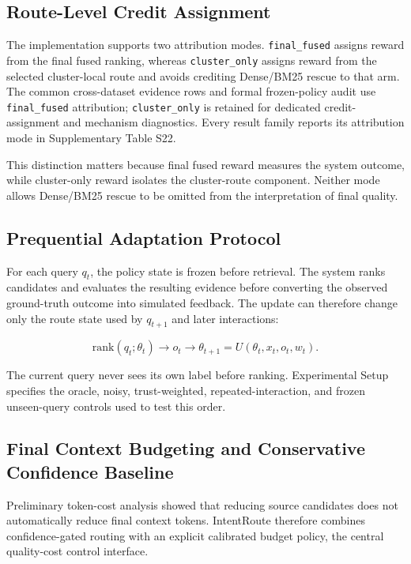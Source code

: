 \subsection{Route-Level Credit Assignment}
\label{sec:04-method:route-level-credit-assignment}

The implementation supports two attribution modes. \nolinkurl{final_fused} assigns reward from the final fused ranking, whereas \nolinkurl{cluster_only} assigns reward from the selected cluster-local route and avoids crediting Dense/BM25 rescue to that arm. The common cross-dataset evidence rows and formal frozen-policy audit use \nolinkurl{final_fused} attribution; \nolinkurl{cluster_only} is retained for dedicated credit-assignment and mechanism diagnostics. Every result family reports its attribution mode in Supplementary Table S22.

This distinction matters because final fused reward measures the system outcome, while cluster-only reward isolates the cluster-route component. Neither mode allows Dense/BM25 rescue to be omitted from the interpretation of final quality.

\subsection{Prequential Adaptation Protocol}
\label{sec:04-method:prequential-adaptation-protocol}

For each query $q_t$, the policy state is frozen before retrieval. The system ranks candidates and evaluates the resulting evidence before converting the observed ground-truth outcome into simulated feedback. The update can therefore change only the route state used by $q_{t+1}$ and later interactions:

\[
\text{rank}(q_t;\theta_t)\rightarrow o_t\rightarrow
\theta_{t+1}=U(\theta_t,x_t,o_t,w_t).
\]

The current query never sees its own label before ranking. Experimental Setup specifies the oracle, noisy, trust-weighted, repeated-interaction, and frozen unseen-query controls used to test this order.

\subsection{Final Context Budgeting and Conservative Confidence Baseline}
\label{sec:04-method:final-context-budgeting-and-conservative-confidence-baseline}

Preliminary token-cost analysis showed that reducing source candidates does not automatically reduce final context tokens. IntentRoute therefore combines confidence-gated routing with an explicit calibrated budget policy, the central quality-cost control interface.

